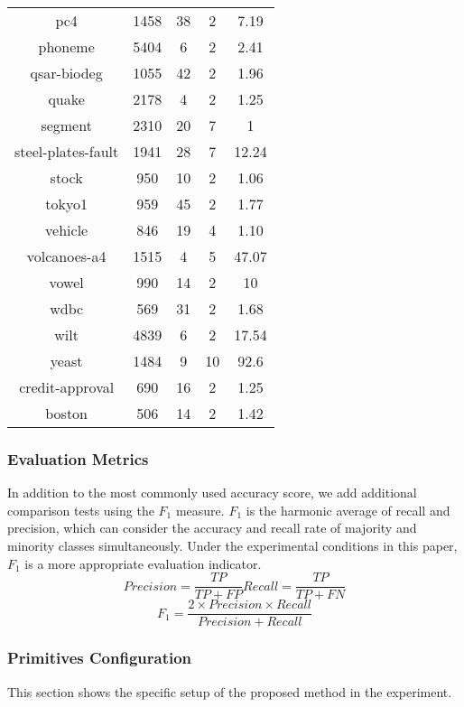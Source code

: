 \documentclass[review]{elsarticle}
\begin{document}
\begin{table}[htbp]
\begin{tabular}{c c c c c}
 		pc4 & 1458 & 38 & 2 & 7.19 \\
 		phoneme & 5404 & 6 & 2 & 2.41 \\
 		qsar-biodeg & 1055 & 42 & 2 & 1.96 \\
 		quake & 2178 & 4 & 2 & 1.25 \\
 		segment & 2310 & 20 & 7 & 1 \\
 		steel-plates-fault & 1941 & 28 & 7 & 12.24 \\
 		stock & 950 & 10 & 2 & 1.06 \\
 		tokyo1 & 959 & 45 & 2 & 1.77 \\
 		vehicle & 846 & 19 & 4 & 1.10 \\
 		volcanoes-a4 & 1515 & 4 & 5 & 47.07 \\
 		vowel & 990 & 14 & 2 & 10 \\
 		wdbc & 569 & 31 & 2 & 1.68 \\
 		wilt & 4839 & 6 & 2 & 17.54 \\
 		yeast & 1484 & 9 & 10 & 92.6 \\
 		credit-approval & 690 & 16 & 2 & 1.25 \\
 		boston & 506 & 14 & 2 & 1.42 \\
 		\bottomrule
 	\end{tabular}
 \end{table}
\subsubsection{Evaluation Metrics}
In addition to the most commonly used accuracy score, we add additional comparison tests using the $F_1$ measure. $F_1$ is the harmonic average of recall and precision, which can consider the accuracy and recall rate of majority and minority classes simultaneously. Under the experimental conditions in this paper, $F_1$ is a more appropriate evaluation indicator.
\begin{equation}\label{eq7}
	Precision=\frac{TP}{TP+FP}   Recall=\frac{TP}{TP+FN}
\end{equation}
\begin{equation}\label{eq8}
	F_1=\frac{2\times Precision\times Recall}{Precision+Recall}
\end{equation}
\subsubsection{Primitives Configuration}
This section shows the specific setup of the proposed method in the experiment.
\end{document}
